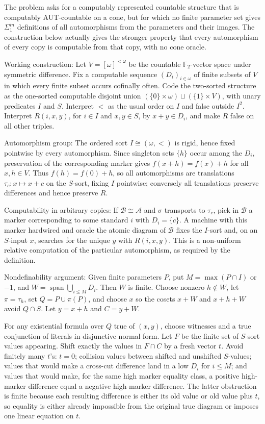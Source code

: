 \documentclass{article}
\begin{document}
The problem asks for a computably represented countable structure that
is computably AUT-countable on a cone, but for which no finite parameter
set gives $\Sigma^{in}_1$ definitions of all automorphisms from the
parameters and their images.  The construction below actually gives the
stronger property that every automorphism of every copy is computable
from that copy, with no cone oracle.

Working construction:
Let $V=[\omega]^{<\omega}$ be the countable $\mathbb F_2$-vector space
under symmetric difference.  Fix a computable sequence
$(D_i)_{i\in\omega}$ of finite subsets of $V$ in which every finite
subset occurs cofinally often.  Code the two-sorted structure as the
one-sorted computable disjoint union
$(\{0\}\times\omega)\sqcup(\{1\}\times V)$, with unary predicates $I$ and
$S$.  Interpret $<$ as the usual order on $I$ and false outside
$I^2$.  Interpret $R(i,x,y)$, for $i\in I$ and $x,y\in S$, by
$x+y\in D_i$, and make $R$ false on all other triples.

Automorphism group:
The ordered sort $I\cong(\omega,<)$ is rigid, hence fixed pointwise by
every automorphism.  Since singleton sets $\{h\}$ occur among the
$D_i$, preservation of the corresponding marker gives
$f(x+h)=f(x)+h$ for all $x,h\in V$.  Thus $f(h)=f(0)+h$, so all
automorphisms are translations $\tau_c:x\mapsto x+c$ on the $S$-sort,
fixing $I$ pointwise; conversely all translations preserve differences
and hence preserve $R$.

Computability in arbitrary copies:
If $\mathcal B\cong\mathcal A$ and $\sigma$ transports to $\tau_c$, pick
in $\mathcal B$ a marker corresponding to some standard $i$ with
$D_i=\{c\}$.  A machine with this marker hardwired and oracle the atomic
diagram of $\mathcal B$ fixes the $I$-sort and, on an $S$-input $x$,
searches for the unique $y$ with $R(i,x,y)$.  This is a non-uniform
relative computation of the particular automorphism, as required by the
definition.

Nondefinability argument:
Given finite parameters $P$, put $M=\max(P\cap I)$ or $-1$, and
$W=\operatorname{span}\bigcup_{i\le M}D_i$.  Then $W$ is finite.  Choose
nonzero $h\notin W$, let $\pi=\tau_h$, set $Q=P\cup\pi(P)$, and choose
$x$ so the cosets $x+W$ and $x+h+W$ avoid $Q\cap S$.  Let $y=x+h$ and
$C=y+W$.

For any existential formula over $Q$ true of $(x,y)$, choose witnesses
and a true conjunction of literals in disjunctive normal form.  Let $F$
be the finite set of $S$-sort values appearing.  Shift exactly the
values in $F\cap C$ by a fresh vector $t$.  Avoid finitely many $t$'s:
$t=0$; collision values between shifted and unshifted $S$-values; values
that would make a cross-cut difference land in a low $D_i$ for
$i\le M$; and values that would make, for the same high marker equality
class, a positive high-marker difference equal a negative high-marker
difference.  The latter obstruction is finite because each resulting
difference is either its old value or old value plus $t$, so equality is
either already impossible from the original true diagram or imposes one
linear equation on $t$.
\end{document}
